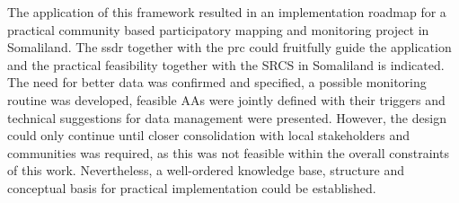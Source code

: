 The application of this framework resulted in an implementation roadmap for a practical community based participatory mapping and monitoring project in Somaliland. The \acrshort{ssdr} together with the \acrshort{prc} could fruitfully guide the application and the practical feasibility together with the SRCS in Somaliland is indicated. The need for better data was confirmed and specified, a possible monitoring routine was developed, feasible AAs were jointly defined with their triggers and technical suggestions for data management were presented. However, the design could only continue until closer consolidation with local stakeholders and communities was required, as this was not feasible within the overall constraints of this work. Nevertheless, a well-ordered knowledge base, structure and conceptual basis for practical implementation could be established.
